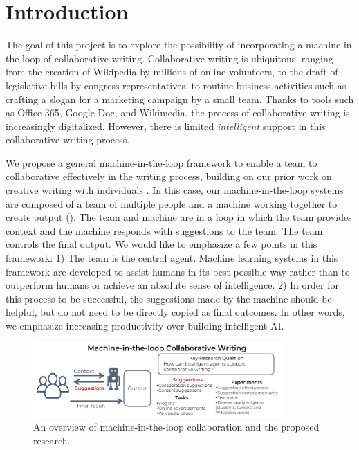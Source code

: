 
\section{Introduction}

The goal of this project is to explore the possibility of incorporating a machine in the loop of collaborative writing.
Collaborative writing is ubiquitous, ranging from the creation of Wikipedia by millions of online volunteers, to the draft of legislative bills by congress representatives, to routine business activities such as crafting a slogan for a marketing campaign by a small team.
Thanks to tools such as Office 365, Google Doc, and Wikimedia, the process of collaborative writing is increasingly digitalized.
However, there is limited {\em intelligent} support in this collaborative writing process.


We propose a general machine-in-the-loop framework to enable a team to collaborative effectively in the writing process, building on our prior work on creative writing with individuals \citep{clark+etal18}.
In this case, our machine-in-the-loop systems are composed of a team of multiple people and a machine working together to create output (). The team and machine are in a loop in which the team provides context and the machine responds with suggestions to the team. The team controls the final output.
We would like to emphasize a few points in this framework:
1)  The team is the central agent. Machine learning systems in this framework are developed to assist humans in its best possible way rather than to outperform humans or achieve an absolute sense of intelligence.
2)  In order for this process to be successful, the suggestions made by the machine should be helpful, but do not need to be directly copied as final outcomes.
In other words, we emphasize increasing productivity over building intelligent AI.

\begin{figure}[t]
\centering
\includegraphics[width=0.85\textwidth]{illustration.pdf}
\caption{An overview of machine-in-the-loop collaboration and the proposed research.}
\label{fig:task}
\end{figure}

